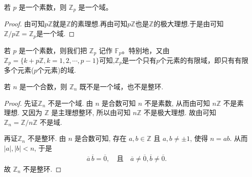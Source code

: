 \documentclass[../../main.tex]{subfiles}
\begin{document}
\begin{proposition}\label{proposition:pZ是Z的一个域}
若 $p$ 是一个素数，则 $\mathbb{Z}_p$ 是一个域。
\end{proposition}
\begin{proof}
由可知$p\mathbb{Z}$就是$\mathbb{Z}$的素理想.再由可知$p\mathbb{Z}$也是$\mathbb{Z}$的极大理想.于是由可知$\mathbb{Z}/p\mathbb{Z}=\mathbb{Z}_p$是一个域.
\end{proof}

\begin{definition}
若 $p$ 是一个素数，则我们把 $\mathbb{Z}_p$ 记作 $\mathbb{F}_p$。特别地，又由$\mathbb{Z}_p=\{k+p\mathbb{Z},k=1,2,\cdots,p-1\}$可知,$\mathbb{Z}_p$是一个只有$p$个元素的有限域，即只有有限多个元素($p$个元素)的域.
\end{definition}

\begin{lemma}
若 $n$ 是一个合数，则 $\mathbb{Z}_n$ 既不是一个域，也不是整环.
\end{lemma}
\begin{proof}
先证$\mathbb{Z}_n$ 不是一个域.
由 \(n\) 是合数可知 \(n\) 不是素数, 从而由可知 \(n\mathbb{Z}\) 不是素理想.
又因为 \(\mathbb{Z}\) 是主理想整环, 所以由可知 \(n\mathbb{Z}\) 不是极大理想.
故由可知 \(\mathbb{Z}_n = \mathbb{Z}/n\mathbb{Z}\) 不是域.

再证$\mathbb{Z}_n$ 不是整环.
由 \(n\) 是合数可知, 存在 \(a, b \in \mathbb{Z}\) 且 \(a, b \ne \pm 1\), 使得 \(n = ab\). 从而 \(|a|, |b| < n\), 于是
\begin{align*}
\overline{a}\,\overline{b} = \overline{0}, \quad \text{且} \quad \overline{a} \ne \overline{0}, \overline{b} \ne \overline{0}.
\end{align*}
故 \(\mathbb{Z}_n\) 不是整环.
\end{proof}
\end{document}
